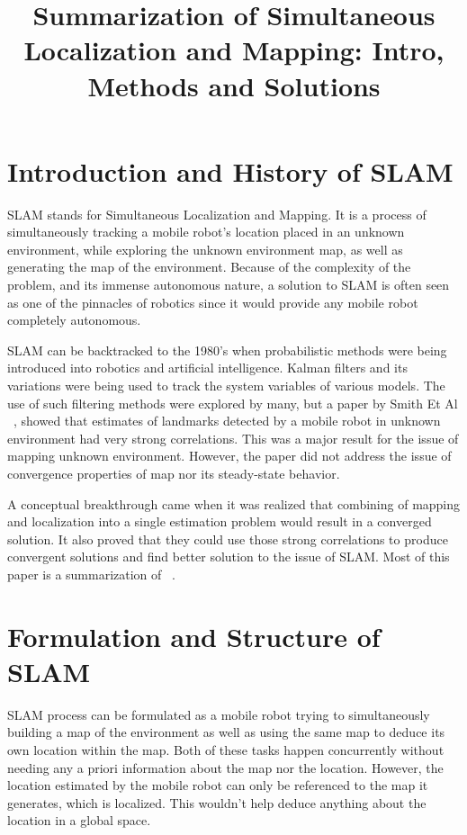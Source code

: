 \documentclass[conference]{IEEEtran}
\begin{document}
\title{Summarization of Simultaneous Localization and Mapping: Intro, Methods and Solutions}

\author{
}

\maketitle

\IEEEpeerreviewmaketitle

\section{Introduction and History of SLAM}
SLAM stands for Simultaneous Localization and Mapping. It is a process of simultaneously tracking a mobile robot's location placed in an unknown environment, while exploring the unknown environment map, as well as generating the map of the environment. Because of the complexity of the problem, and its immense autonomous nature, a solution to SLAM is often seen as one of the pinnacles of robotics since it would provide any mobile robot completely autonomous.
\par SLAM can be backtracked to the 1980's when probabilistic methods were being introduced into robotics and artificial intelligence. Kalman filters and its variations were being used to track the system variables of various models. The use of such filtering methods were explored by many, but a paper by Smith Et Al ~\cite{smith_et_al}, showed that estimates of landmarks detected by a mobile robot in unknown environment had very strong correlations. This was a major result for the issue of mapping unknown environment. However, the paper did not address the issue of convergence properties of map nor its steady-state behavior.
\par A conceptual breakthrough came when it was realized that combining of mapping and localization into a single estimation problem would result in a converged solution. It also proved that they could use those strong correlations to produce convergent solutions and find better solution to the issue of SLAM. Most of this paper is a summarization of ~\cite{slamPaper_1,slamPaper_2}.

\section{Formulation and Structure of SLAM}
SLAM process can be formulated as a mobile robot trying to simultaneously building a map of the environment as well as using the same map to deduce its own location within the map. Both of these tasks happen concurrently without needing any a priori information about the map nor the location. However, the location estimated by the mobile robot can only be referenced to the map it generates, which is localized. This wouldn't help deduce anything about the location in a global space.
\end{document}
